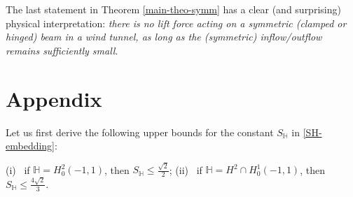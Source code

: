 \documentclass[11pt,a4paper]{amsart}
\theoremstyle{remark}
\theoremstyle{definition}
\numberwithin{equation}{section}
\numberwithin{proposition}{section}
\begin{document}
The last statement in Theorem \ref{main-theo-symm} has a clear (and surprising) physical interpretation: {\em there is no lift force acting on a symmetric (clamped or hinged) beam in a wind tunnel,
as long as the (symmetric) inflow/outflow remains sufficiently small}.




\section*{Appendix}\label{sec_comp}

	Let us first derive the following upper bounds for the constant $S_\mathbb{H}$ in \eqref{SH-embedding}:
    \begin{center}
(i) \ if $\mathbb{H}= H_0^2(-1,1)$, then $S_\mathbb{H}\le\frac{\sqrt{2}}{2}$; \quad
(ii) \ if $\mathbb{H}= H^2\cap H_0^1(-1,1)$, then
$S_{\mathbb{H}} \leq \frac{4\sqrt{2}}{3}.$
\end{center}
\end{document}
